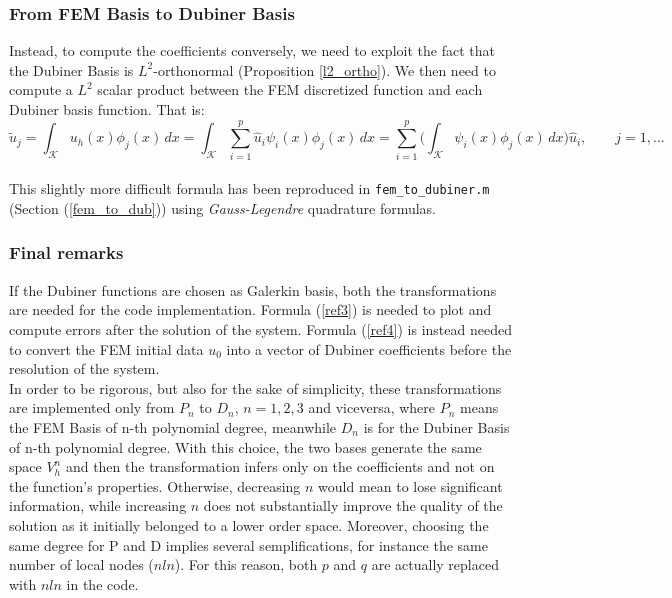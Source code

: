 \documentclass[a4paper,11pt]{article}
\begin{document}
	\subsubsection{From FEM Basis to Dubiner Basis}
	\noindent Instead, to compute the coefficients conversely, we need to exploit the fact that the Dubiner Basis is $L^2$-orthonormal (Proposition \ref{l2_ortho}). We then need to compute a $L^2$ scalar product between the FEM discretized function and each Dubiner basis function. That is:
	\begin{equation}\label{ref4}
	\tilde{u}_j = \int_\mathcal{K} u_h(x) \phi_j(x) \,dx = \int_{\mathcal{K}} \sum_{i=1}^p \hat{u}_i\psi_i(x) \phi_j(x) \,dx = \sum_{i=1}^p \Big(\int_{\mathcal{K}}\psi_i(x)\phi_j(x)\,dx \Big) \hat{u}_i, \qquad j=1,...
	\end{equation}
	\vspace{2mm} \\
	\noindent This slightly more difficult formula has been reproduced in \texttt{fem\_to\_dubiner.m} (Section (\ref{fem_to_dub})) using \emph{Gauss-Legendre} quadrature formulas.
	\subsubsection{Final remarks}\label{dub}
	\noindent If the Dubiner functions are chosen as Galerkin basis, both the transformations are needed for the code implementation. Formula (\ref{ref3}) is needed to plot and compute errors after the solution of the system. Formula (\ref{ref4}) is instead needed to convert the FEM initial data $u_0$ into a vector of Dubiner coefficients before the resolution of the system.\\
	
	\noindent In order to be rigorous, but also for the sake of simplicity, these transformations are implemented only from $P_n$ to $D_n$, $n=1,2,3$ and viceversa, where $P_n$ means the FEM Basis of n-th polynomial degree, meanwhile $D_n$ is for the Dubiner Basis of n-th polynomial degree. With this choice, the two bases generate the same space $V_h^n$ and then the transformation infers only on the coefficients and not on the function's properties. Otherwise, decreasing $n$ would mean to lose significant information, while increasing $n$ does not substantially improve the quality of the solution as it initially belonged to a lower order space. Moreover, choosing the same degree for P and D implies several semplifications, for instance the same number of local nodes ($nln$). For this reason, both $p$ and $q$ are actually replaced with $nln$ in the code.
	
\end{document}
